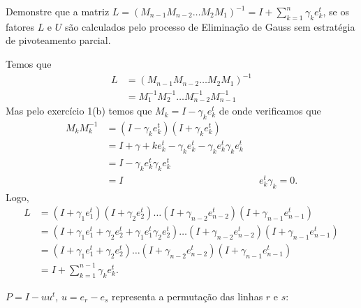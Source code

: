 \begin{questions}
    \question Demonstre que a matriz $L = \left( M_{n - 1} M_{n - 2} \ldots M_2 M_1 \right)^{-1} = I + \sum_{k = 1}^n \gamma_k e_k^t$, se os fatores $L$ e $U$ s\~{a}o calculados pelo processo de Elimina\c{c}\~{a}o de Gauss sem estrat\'{e}gia de pivoteamento parcial.
    \begin{solution}
        Temos que
        \begin{align*}
            L &= \left( M_{n - 1} M_{n - 2} \ldots M_2 M_1 \right)^{-1} \\
            &= M_1^{-1} M_2^{-1} \ldots M_{n - 2}^{-1} M_{n - 1}^{-1}
        \end{align*}
        Mas pelo exerc\'{i}cio 1(b) temos que $M_k = I - \gamma_k e_k^t$ de onde verificamos que
        \begin{align*}
            M_k M_k^{-1} &= \left( I - \gamma_k e_k^t \right) \left( I + \gamma_k e_k^t \right) \\
            &= I + \gamma+k e_k^t - \gamma_k e_k^t - \gamma_k e_k^t \gamma_k e_k^t \\
            &= I - \gamma_k e_k^t \gamma_k e_k^t \\
            &= I && e_k^t \gamma_k = 0.
        \end{align*}
        Logo,
        \begin{align*}
            L&= \left( I + \gamma_1 e_1^t \right) \left( I + \gamma_2 e_2^t \right) \ldots \left( I + \gamma_{n - 2} e_{n - 2}^t \right) \left( I + \gamma_{n - 1} e_{n - 1}^t \right) \\
            &= \left( I + \gamma_1 e_1^t + \gamma_2 e_2^t + \gamma_1 e_1^t \gamma_2 e_2^t \right) \ldots \left( I + \gamma_{n - 2} e_{n - 2}^t \right) \left( I + \gamma_{n - 1} e_{n - 1}^t \right) \\
            &= \left( I + \gamma_1 e_1^t + \gamma_2 e_2^t \right) \ldots \left( I + \gamma_{n - 2} e_{n - 2}^t \right) \left( I + \gamma_{n - 1} e_{n - 1}^t \right) \\
            &= I + \sum_{k = 1}^{n - 1} \gamma_k e_k^t.
        \end{align*}
    \end{solution}

    \question $P = I - u u^t$, $u = e_r - e_s$ representa a permuta\c{c}\~{a}o das linhas $r$ e $s$:
\end{questions}
